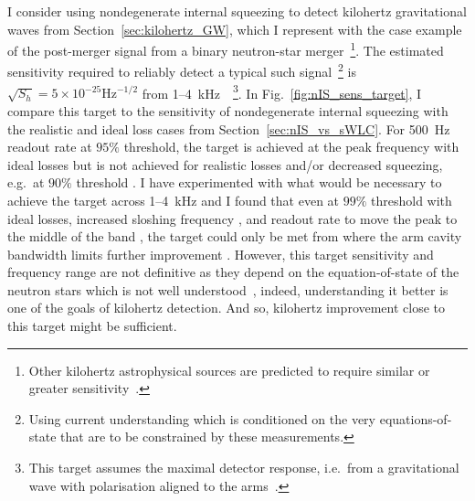 I consider using nondegenerate internal squeezing to detect kilohertz gravitational waves from Section~\ref{sec:kilohertz_GW}, which I represent with the case example of the post-merger signal from a binary neutron-star merger~\footnote{Other kilohertz astrophysical sources are predicted to require similar or greater sensitivity~\cite{}.}. The estimated sensitivity required to reliably detect a typical such signal~\footnote{Using current understanding which is conditioned on the very equations-of-state that are to be constrained by these measurements.} is $\sqrt{S_h}=5\times10^{-25} \mathrm{Hz}^{-1/2}$ from 1--4~kHz~\cite{miaoDesignGravitationalWaveDetectors2018}~\footnote{This target assumes the maximal detector response, i.e.\ from a gravitational wave with polarisation aligned to the arms~\cite{}.}.
In Fig.~\ref{fig:nIS_sens_target}, I compare this target to the sensitivity of nondegenerate internal squeezing with the realistic and ideal loss cases from Section~\ref{sec:nIS_vs_sWLC}. 
For 500~Hz readout rate at $95\%$ threshold, the target is achieved at the peak frequency  with ideal losses but is not achieved for realistic losses  and/or decreased squeezing, e.g.\ at $90\%$ threshold . I have experimented with what would be necessary to achieve the target across 1--4~kHz and I found that even at $99\%$ threshold with ideal losses, increased sloshing frequency , and readout rate to move the peak to the middle of the band , the target could only be met from  where the arm cavity bandwidth limits further improvement . 
However, this target sensitivity and frequency range are not definitive as they depend on the equation-of-state of the neutron stars which is not well understood~\cite{}, indeed, understanding it better is one of the goals of kilohertz detection. And so, kilohertz improvement close to this target might be sufficient.
